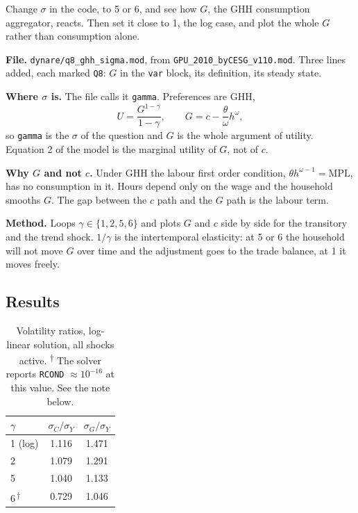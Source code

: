 \documentclass[11pt,a4paper]{article}
\newcommand{\note}[2]{\smallskip\noindent\textbf{#1.} #2\par}
\begin{document}
\begin{question}
Change $\sigma$ in the code, to 5 or 6, and see how $G$, the GHH consumption
aggregator, reacts. Then set it close to 1, the log case, and plot the whole
$G$ rather than consumption alone.
\end{question}

\note{File}{\texttt{dynare/q8\_ghh\_sigma.mod}, from
\texttt{GPU\_2010\_byCESG\_v110.mod}. Three lines added, each marked
\texttt{Q8}: $G$ in the \texttt{var} block, its definition, its steady state.}

\note{Where $\sigma$ is}{The file calls it \texttt{gamma}. Preferences are GHH,
\[ U = \frac{G^{1-\gamma}}{1-\gamma}, \qquad
   G = c - \frac{\theta}{\omega} h^{\omega}, \]
so \texttt{gamma} is the $\sigma$ of the question and $G$ is the whole argument
of utility. Equation 2 of the model is the marginal utility of $G$, not of $c$.}

\note{Why $G$ and not $c$}{Under GHH the labour first order condition,
$\theta h^{\omega-1} = \mathrm{MPL}$, has no consumption in it. Hours depend
only on the wage and the household smooths $G$. The gap between the $c$ path
and the $G$ path is the labour term.}

\note{Method}{Loops $\gamma \in \{1, 2, 5, 6\}$ and plots $G$ and $c$ side by
side for the transitory and the trend shock. $1/\gamma$ is the intertemporal
elasticity: at 5 or 6 the household will not move $G$ over time and the
adjustment goes to the trade balance, at 1 it moves freely.}

\subsection*{Results}

\begin{table}[h]\centering
\begin{tabular}{lcc}
\toprule
$\gamma$ & $\sigma_C/\sigma_Y$ & $\sigma_G/\sigma_Y$ \\
\midrule
1 (log) & 1.116 & 1.471 \\
2       & 1.079 & 1.291 \\
5       & 1.040 & 1.133 \\
6\,\textsuperscript{$\dagger$} & 0.729 & 1.046 \\
\bottomrule
\end{tabular}
\caption{Volatility ratios, log-linear solution, all shocks active.
\textsuperscript{$\dagger$} The solver reports
\texttt{RCOND} $\approx 10^{-16}$ at this value. See the note below.}
\end{table}
\end{document}
